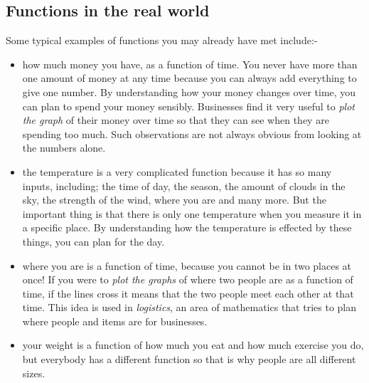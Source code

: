 \subsection*{Functions in the real world}
\nopagebreak
\label{m39337*id232071}Some typical examples of functions you may already have met
include:-\par 
\label{m39337*id232074
}\begin{itemize}[noitemsep]
\label{m39337*uid1}\item how much money you have, as a function of time. You never have more than one amount of money at any time because you can always add everything to give one number. By understanding how your money changes over time, you can plan to spend your money sensibly. Businesses find it very useful to \textsl{plot the graph} of their money over time so that they can see when they are spending too much. Such observations are not always obvious from looking at the numbers alone.
\label{m39337*uid2}\item the temperature is a very complicated function because it has so many inputs, including; the time of day, the season, the amount of clouds in the sky, the strength of the wind, where you are and many more. But the important thing is that there is only one temperature when you measure it in a specific place. By understanding how the temperature is effected by these things, you can plan
for the day.
\label{m39337*uid3}\item where you are is a function of time, because you cannot be in two places at once! If you were to \textsl{plot the graphs} of where two people are as a function of time, if the lines cross it means that the two people meet each other at that time. This idea is used in \textsl{logistics}, an area of mathematics that tries to plan where people and items are for businesses.
\label{m39337*uid4}\item your weight is a function of how much you eat and how much exercise you do, but everybody has a different function so that is why people are all different sizes.
\end{itemize}
\label{m39337*cid4}
